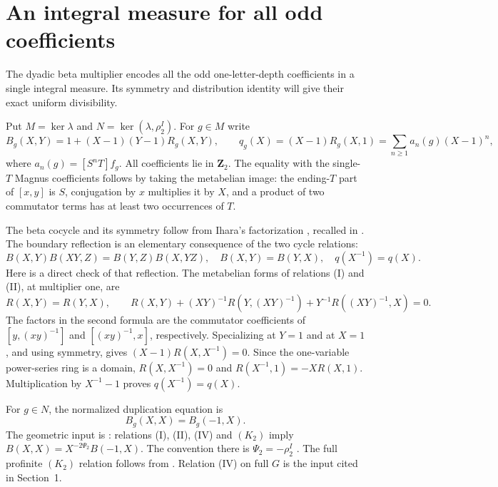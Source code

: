 \section{An integral measure for all odd coefficients}
\label{sec:integral-beta-measure}

The dyadic beta multiplier encodes all the odd one-letter-depth
coefficients in a single integral measure. Its symmetry and distribution
identity will give their exact uniform divisibility.

Put $M=\ker\lambda$ and $N=\ker(\lambda,\rho_2^I)$.
For $g\in M$ write
\[
 B_g(X,Y)=1+(X-1)(Y-1)R_g(X,Y),\qquad
 q_g(X)=(X-1)R_g(X,1)=\sum_{n\ge1}a_n(g)(X-1)^n,
\]
where $a_n(g)=[S^nT]f_g$.  All coefficients lie in $\mathbf Z_2$.
The equality with the single-$T$ Magnus coefficients follows by taking
the metabelian image: the ending-$T$ part of $[x,y]$ is $S$, conjugation
by $x$ multiplies it by $X$, and a product of two commutator terms has
at least two occurrences of $T$.

The beta cocycle and its symmetry follow from Ihara's factorization
\cite[Proposition~1.6.1]{Ihara1999}, recalled in
\cite[Section~2.3, p.~101]{Furusho2003}. The boundary reflection is
an elementary consequence of the two cycle relations:
\[
 B(X,Y)B(XY,Z)=B(Y,Z)B(X,YZ),\quad B(X,Y)=B(Y,X),
 \quad q(X^{-1})=q(X).
\]
Here is a direct check of that reflection. The metabelian forms of
relations (I) and (II), at multiplier one, are
\[
 R(X,Y)=R(Y,X),\qquad
 R(X,Y)+(XY)^{-1}R(Y,(XY)^{-1})
       +Y^{-1}R((XY)^{-1},X)=0.
\]
The factors in the second formula are the commutator coefficients
of $[y,(xy)^{-1}]$ and $[(xy)^{-1},x]$, respectively.
Specializing at $Y=1$ and at $X=1$, and using symmetry, gives
$(X-1)R(X,X^{-1})=0$. Since the one-variable power-series ring is
a domain, $R(X,X^{-1})=0$ and $R(X^{-1},1)=-XR(X,1)$.
Multiplication by $X^{-1}-1$ proves $q(X^{-1})=q(X)$.

For $g\in N$, the normalized duplication equation is
\begin{equation}
 B_g(X,X)=B_g(-1,X).\label{eq:measure-duplication}
\end{equation}
The geometric input is \cite[Theorem~3.1 and the displayed
$(A_2^0)$, p.~102]{Furusho2003}: relations (I), (II), (IV) and
$(K_2)$ imply $B(X,X)=X^{-2\Psi_2}B(-1,X)$.
The convention there is $\Psi_2=-\rho_2^I$
\cite[p.~100, footnote]{Furusho2003}.
The full profinite $(K_2)$ relation follows from
\cite[Section~8, Theorem~8.1, equation~(50), author p.~30]{Enriquez2007}.
Relation (IV) on full $G$ is the input cited in Section~1.


